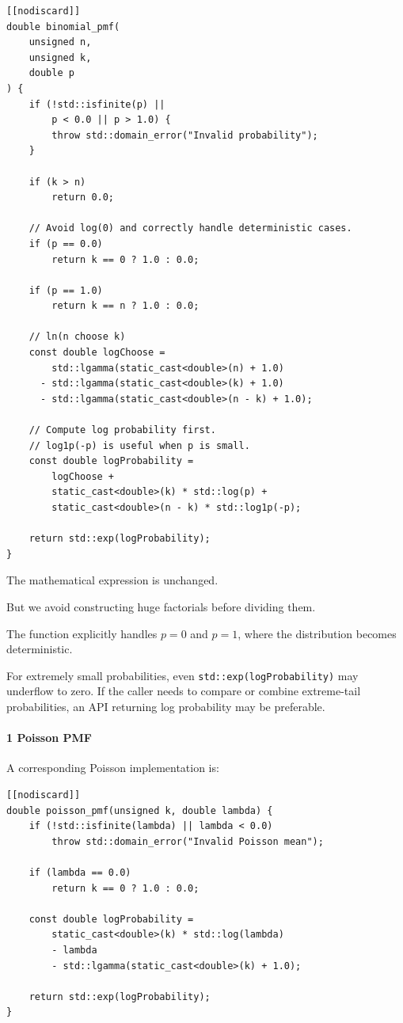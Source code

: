 \begin{verbatim}
[[nodiscard]]
double binomial_pmf(
    unsigned n,
    unsigned k,
    double p
) {
    if (!std::isfinite(p) ||
        p < 0.0 || p > 1.0) {
        throw std::domain_error("Invalid probability");
    }

    if (k > n)
        return 0.0;

    // Avoid log(0) and correctly handle deterministic cases.
    if (p == 0.0)
        return k == 0 ? 1.0 : 0.0;

    if (p == 1.0)
        return k == n ? 1.0 : 0.0;

    // ln(n choose k)
    const double logChoose =
        std::lgamma(static_cast<double>(n) + 1.0)
      - std::lgamma(static_cast<double>(k) + 1.0)
      - std::lgamma(static_cast<double>(n - k) + 1.0);

    // Compute log probability first.
    // log1p(-p) is useful when p is small.
    const double logProbability =
        logChoose +
        static_cast<double>(k) * std::log(p) +
        static_cast<double>(n - k) * std::log1p(-p);

    return std::exp(logProbability);
}
\end{verbatim}

The mathematical expression is unchanged.

But we avoid constructing huge factorials before dividing them.

The function explicitly handles \(p=0\) and \(p=1\), where the distribution becomes deterministic.

For extremely small probabilities, even \texttt{std::exp(logProbability)} may underflow to zero. If the caller needs to compare or combine extreme-tail probabilities, an API returning log probability may be preferable.

\paragraph{1 Poisson PMF}\label{poisson-pmf}

A corresponding Poisson implementation is:

\begin{verbatim}
[[nodiscard]]
double poisson_pmf(unsigned k, double lambda) {
    if (!std::isfinite(lambda) || lambda < 0.0)
        throw std::domain_error("Invalid Poisson mean");

    if (lambda == 0.0)
        return k == 0 ? 1.0 : 0.0;

    const double logProbability =
        static_cast<double>(k) * std::log(lambda)
        - lambda
        - std::lgamma(static_cast<double>(k) + 1.0);

    return std::exp(logProbability);
}
\end{verbatim}

